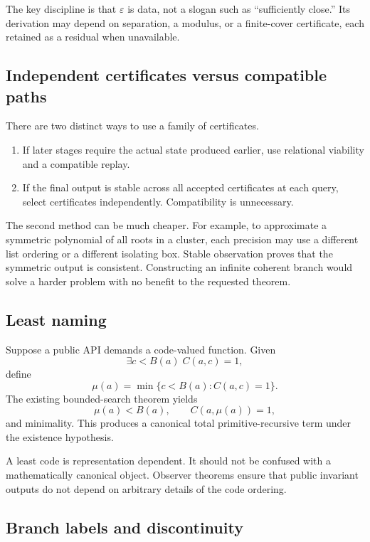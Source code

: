 The key discipline is that \(\varepsilon\) is data, not a slogan such as
``sufficiently close.''  Its derivation may depend on separation, a modulus,
or a finite-cover certificate, each retained as a residual when unavailable.

\subsection{Independent certificates versus compatible paths}

There are two distinct ways to use a family of certificates.

\begin{enumerate}
\item If later stages require the actual state produced earlier, use relational
viability and a compatible replay.
\item If the final output is stable across all accepted certificates at each
query, select certificates independently.  Compatibility is unnecessary.
\end{enumerate}

The second method can be much cheaper.  For example, to approximate a symmetric
polynomial of all roots in a cluster, each precision may use a different list
ordering or a different isolating box.  Stable observation proves that the
symmetric output is consistent.  Constructing an infinite coherent branch
would solve a harder problem with no benefit to the requested theorem.

\subsection{Least naming}

Suppose a public API demands a code-valued function.  Given
\[
 \exists c<B(a)\;C(a,c)=1,
\]
define
\[
 \mu(a)=\min\{c<B(a):C(a,c)=1\}.
\]
The existing bounded-search theorem yields
\[
 \mu(a)<B(a),\qquad C(a,\mu(a))=1,
\]
and minimality.  This produces a canonical total primitive-recursive term
under the existence hypothesis.

A least code is representation dependent.  It should not be confused with a
mathematically canonical object.  Observer theorems ensure that public
invariant outputs do not depend on arbitrary details of the code ordering.

\subsection{Branch labels and discontinuity}

